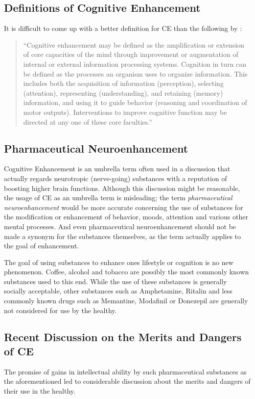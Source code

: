 \subsection{Definitions of Cognitive Enhancement}
It is difficult to come up with a better definition for CE than the following by \citet{Sandberg2006}: 

\begin{quotation}
``Cognitive enhancement may be defined as the amplification or extension of core capacities of the mind through improvement or augmentation of internal or external information processing systems. Cognition in turn can be defined as the processes an organism uses to organize information. This includes both the acquisition of information (perception), selecting (attention), representing (understanding), and retaining (memory) information, and using it to guide behavior (reasoning and coordination of motor outputs). Interventions to improve cognitive function may be directed at any one of these core faculties.''
\end{quotation}

\subsection{Pharmaceutical Neuroenhancement}
Cognitive Enhancement is an umbrella term often used in a discussion that actually regards neurotropic (nerve-going) substances with a reputation of boosting higher brain functions. Although this discussion might be reasonable, the usage of CE as an umbrella term is misleading; the term \textit{pharmaceutical neuroenhancement} would be more accurate concerning the use of substances for the modification or enhancement of behavior, moods, attention and various other mental processes. And even pharmaceutical neuroenhancement should not be made a synonym for the substances themselves, as the term actually applies to the goal of enhancement.

The goal of using substances to enhance ones lifestyle or cognition is no new phenomenon. Coffee, alcohol and tobacco are possibly the most commonly known substances used to this end. While the use of these substances is generally socially acceptable, other substances such as Amphetamine, Ritalin and less commonly known drugs such as Memantine, Modafinil or Donezepil are generally not considered for use by the healthy.

\subsection{Recent Discussion on the Merits and Dangers of CE}
The promise of gains in intellectual ability by such pharmaceutical substances as the aforementioned led to considerable discussion about the merits and dangers of their use in the healthy.

